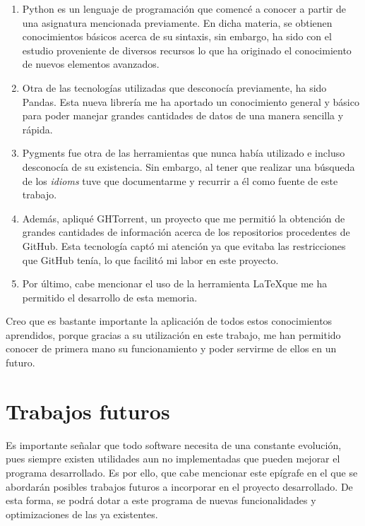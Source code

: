 \documentclass[a4paper, 12pt]{book}
\begin{document}
\begin{enumerate}
  \item Python es un lenguaje de programación que comencé a conocer a partir de una asignatura mencionada previamente. En dicha materia, se obtienen conocimientos básicos acerca de su sintaxis, sin embargo, ha sido con el estudio proveniente de diversos recursos lo que ha originado el conocimiento de nuevos elementos avanzados.
  
  \item Otra de las tecnologías utilizadas que desconocía previamente, ha sido Pandas. Esta nueva librería me ha aportado un conocimiento general y básico para poder manejar grandes cantidades de datos de una manera sencilla y rápida.

  \item Pygments fue otra de las herramientas que nunca había utilizado e incluso desconocía de su existencia. Sin embargo, al tener que realizar una búsqueda de los \textit{idioms} tuve que documentarme y recurrir a él como fuente de este trabajo.
  
  \item Además, apliqué GHTorrent, un proyecto que me permitió la obtención de grandes cantidades de información acerca de los repositorios procedentes de GitHub. Esta tecnología captó mi atención ya que evitaba las restricciones que GitHub tenía, lo que facilitó mi labor en este proyecto.
  
  \item Por último, cabe mencionar el uso de la herramienta \LaTeX  que me ha permitido el desarrollo de esta memoria.
\end{enumerate}

Creo que es bastante importante la aplicación de todos estos conocimientos aprendidos, porque gracias a su utilización en este trabajo, me han permitido conocer de primera mano su funcionamiento y poder servirme de ellos en un futuro.


\section{Trabajos futuros}
\label{sec:trabajos_futuros}

Es importante señalar que todo software necesita de una constante evolución, pues siempre existen utilidades aun no implementadas que pueden mejorar el programa desarrollado. Es por ello, que cabe mencionar este epígrafe en el que se abordarán posibles trabajos futuros a incorporar en el proyecto desarrollado. De esta forma, se podrá dotar a este programa de nuevas funcionalidades y optimizaciones de las ya existentes.
\end{document}
